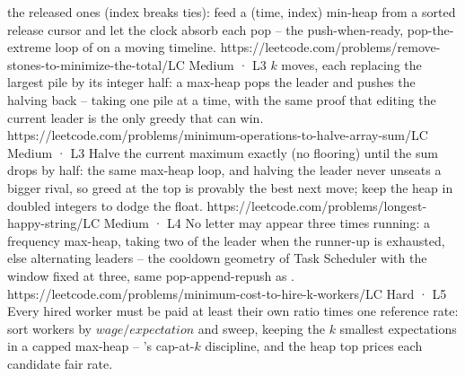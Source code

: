 \begin{mixedset}
{    the released ones (index breaks ties): feed a (time, index) min-heap from a sorted
    release cursor and let the clock absorb each pop -- the push-when-ready, pop-the-extreme
    loop of  on a moving timeline.}
    {https://leetcode.com/problems/remove-stones-to-minimize-the-total/}{LC Medium · L3}
    {$k$ moves, each replacing the largest pile by its integer half: a max-heap pops the
    leader and pushes the halving back --  taking one pile at a time,
    with the same proof that editing the current leader is the only greedy that can win.}
    {https://leetcode.com/problems/minimum-operations-to-halve-array-sum/}{LC Medium · L3}
    {Halve the current maximum exactly (no flooring) until the sum drops by half: the same
    max-heap loop, and halving the leader never unseats a bigger rival, so greed at the top
    is provably the best next move; keep the heap in doubled integers to dodge the float.}
    {https://leetcode.com/problems/longest-happy-string/}{LC Medium · L4}
    {No letter may appear three times running: a frequency max-heap, taking two of the leader
    when the runner-up is exhausted, else alternating leaders -- the cooldown geometry of
    Task Scheduler with the window fixed at three, same pop-append-repush as
    .}
    {https://leetcode.com/problems/minimum-cost-to-hire-k-workers/}{LC Hard · L5}
    {Every hired worker must be paid at least their own ratio times one reference rate: sort
    workers by $\mathit{wage}/\mathit{expectation}$ and sweep, keeping the $k$ smallest
    expectations in a capped max-heap -- 's cap-at-$k$ discipline, and the
    heap top prices each candidate fair rate.}
\end{mixedset}


